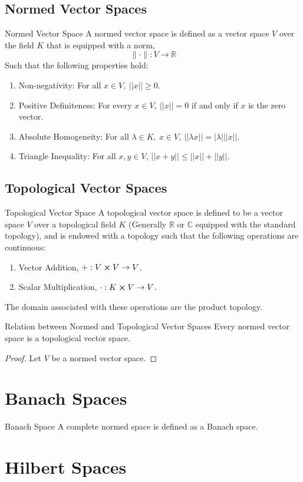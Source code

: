 \section{Normed Vector Spaces}
\begin{Definition}{Normed Vector Space}\label{normed_vector_space}
  A normed vector space is defined as a vector space $V$ over the field $K$ that is equipped with a norm, $$\| \cdot \|:V\to\mathbb{R}$$ Such that the following properties hold:
  \begin{enumerate}
    \item Non-negativity: For all $x\in V,\ ||x||\geq 0$.
    \item Positive Definiteness: For every $x\in V,\ ||x||=0$ if and only if $x$ is the zero vector.
    \item Absolute Homogeneity: For all $\lambda\in K,\ x\in V,\ ||\lambda x||=|\lambda| ||x||$.
    \item Triangle Inequality: For all $x,y\in V$, $||x+y||\leq||x||+||y||$.
  \end{enumerate}
\end{Definition}
\section{Topological Vector Spaces}
\begin{Definition}{Topological Vector Space}\label{topological_vector_space}
  A topological vector space is defined to be a vector space $V$ over a topological field $K$ (Generally $\mathbb{R}$ or $\mathbb{C}$ equipped with the standard topology), and is endowed with a topology such that the following operations are continuous:
  \begin{enumerate}
    \item Vector Addition, $+: V\cross V\to V$.
    \item Scalar Multiplication, $\cdot: K\cross V\to V$.
  \end{enumerate}
  The domain associated with these operations are the product topology.
\end{Definition}
\begin{Theorem}{Relation between Normed and Topological Vector Spaces}\label{relation_between_normed_and_topological_vector_spaces}
  Every normed vector space is a topological vector space.
\end{Theorem}
\begin{proof}
  Let $V$ be a normed vector space.
\end{proof}
\chapter{Banach Spaces}
\begin{Definition}{Banach Space}\label{banach_space}
  A complete normed space is defined as a Banach space.
\end{Definition}
\chapter{Hilbert Spaces}
